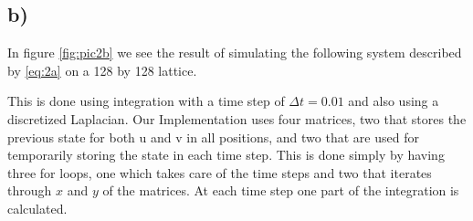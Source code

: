 \subsection*{b)}

In figure \ref{fig:pic2b} we see the result of simulating the following system described by \eqref{eq:2a} on a 128 by 128 lattice.

This is done using integration with a time step of $\Delta t = 0.01$ and also using a discretized Laplacian. Our Implementation uses four matrices, two that stores the previous state for both u and v in all positions, and two that are used for temporarily storing the state in each time step. This is done simply by having three for loops, one which takes care of the time steps and two that iterates through $x$ and $y$ of the matrices. At each time step one part of the integration is calculated.

